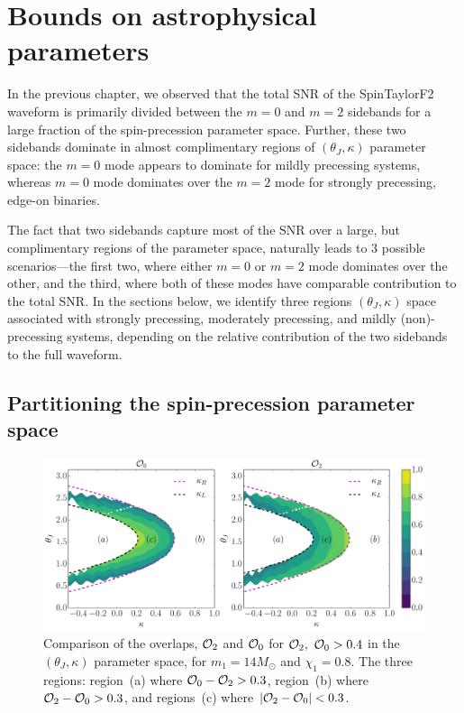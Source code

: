 
\chapter{Bounds on astrophysical parameters}

In the previous chapter, we observed that the total SNR of the SpinTaylorF2
waveform is primarily divided between the $m=0$ and $m=2$ sidebands for a
large fraction of the spin-precession parameter space. Further, these two
sidebands dominate in almost complimentary regions of $(\theta_J, \kappa)$
parameter space: the $m=0$ mode appears to dominate for mildly precessing
systems, whereas $m=0$ mode dominates over the $m=2$ mode for strongly
precessing, edge-on binaries.

The fact that two sidebands capture most of the SNR over a large, but
complimentary regions of the parameter space, naturally leads to 3 possible
scenarios---the first two, where either $m=0$ or $m=2$ mode dominates over the
other, and the third, where both of these modes have comparable contribution
to the total SNR. In the sections below, we identify three regions $(\theta_J,
\kappa)$ space associated with strongly precessing, moderately precessing, and
mildly (non)-precessing systems, depending on the relative contribution of the
two sidebands to the full waveform.

\section{Partitioning the spin-precession parameter space}

\begin{figure}[!tp]
\centering
\includegraphics[width=0.8\linewidth]{images/OVLP_cut.pdf}
\caption{\small{Comparison of the overlaps, ${\cal{O}}_2$ and ${\cal{O}}_0$
for ${\cal{O}}_2, ~{\cal{O}}_0 > 0.4$ in the $(\theta_J, \kappa)$ parameter
space, for $m_{1}=14M_{\odot}$ and $\chi_1=0.8$. The three regions: region~(a)
where ${\cal{O}}_0 - {\cal{O}}_2 > 0.3$, region~(b) where ${\cal{O}}_2 -
{\cal{O}}_0 > 0.3$, and regions~(c) where $|{\cal{O}}_2-{\cal{O}}_0|< 0.3$.}}
\label{FIG:OVLP_cut_regions}
\end{figure}


